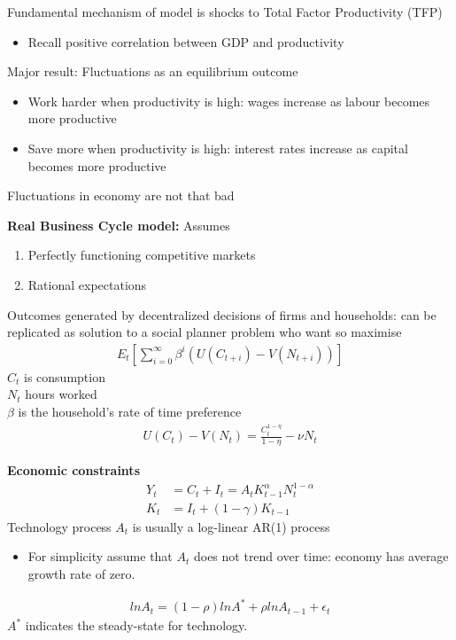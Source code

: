 \documentclass{beamer}
\begin{document}
\begin{frame}
  Fundamental mechanism of model is shocks to Total Factor Productivity (TFP)
  \begin{itemize}
    \item Recall positive correlation between GDP and productivity
  \end{itemize}
  \medskip
  Major result: Fluctuations as an equilibrium outcome
  \begin{itemize}
    \item Work harder when productivity is high: wages increase as labour becomes more productive
    \item Save more when productivity is high: interest rates increase as capital becomes more productive
  \end{itemize}
  \medskip
  Fluctuations in economy are not that bad
\end{frame}


\begin{frame}
  \textbf{Real Business Cycle model:} Assumes
  \begin{enumerate}
    \item Perfectly functioning competitive markets
    \item Rational expectations
  \end{enumerate}
  \medskip
  Outcomes generated by decentralized decisions of firms and households: can be replicated as solution to a social planner problem who want so maximise
 \begin{align}
  E_t \left[\sum^{\infty}_{i=0} \beta^i(U(C_{t+i})-V(N_{t+i})) \right]
 \end{align}
 $C_t$ is consumption\\
 $N_t$ hours worked\\
 $\beta$ is the household's rate of time preference 
\begin{align}
  U(C_t)-V(N_t)=\frac{C_t^{1-\eta}}{1-\eta}-\nu N_t
\end{align}
\end{frame}

\begin{frame}
 \textbf{Economic constraints}
\begin{align}
  Y_t &= C_t + I_t = A_tK^\alpha_{t-1}N^{1-\alpha}_t\\
  K_t &= I_t + (1-\gamma)K_{t-1}
\end{align}
  Technology process $A_t$ is usually a log-linear AR(1) process
  \begin{itemize}
    \item For simplicity assume that $A_t$ does not trend over time: economy has average growth rate of zero.
  \end{itemize}
 \begin{align}
  ln A_t= (1-\rho) ln A^* + \rho ln A_{t-1} + \epsilon_t
\end{align}
$A^*$ indicates the steady-state for technology.
\end{frame}
\end{document}
